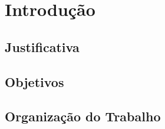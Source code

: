 \chapter{Introdução} \label{Introducao}

\section{Justificativa}

\section{Objetivos}

\section{Organização do Trabalho}
